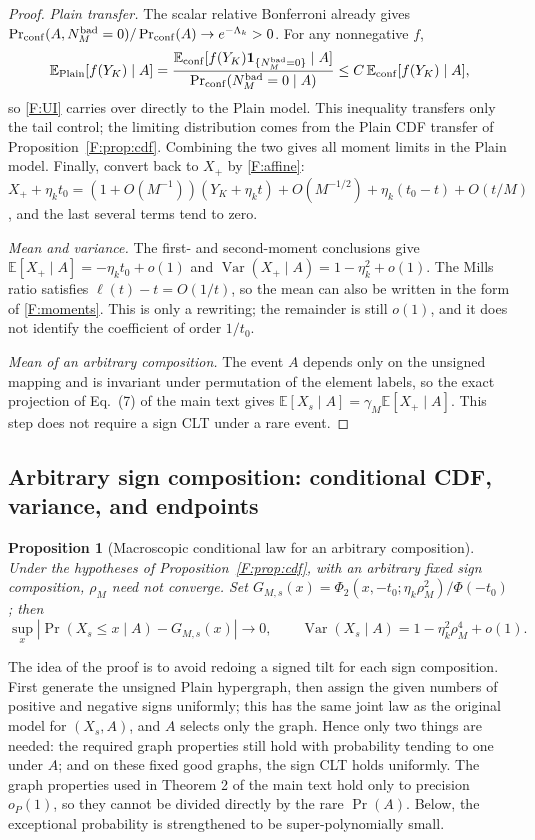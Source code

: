 \documentclass[a4paper,11pt]{article}
\newtheorem{proposition}[theorem]{Proposition}
\numberwithin{equation}{section}
\newcommand{\E}{\mathbb E}
\newcommand{\Var}{\operatorname{Var}}
\begin{document}
\begin{proof}
\emph{Plain transfer.} The scalar relative Bonferroni already gives
$\Pr_{\rm conf}(A,N^{\rm bad}_M=0)/\Pr_{\rm conf}(A)\to e^{-\Lambda_k}>0$. For any nonnegative $f$,
\[
\E_{\rm Plain}[f(Y_K)\mid A]=\frac{\E_{\rm conf}[f(Y_K)\mathbf1_{\{N^{\rm bad}_M=0\}}\mid A]}{\Pr_{\rm conf}(N^{\rm bad}_M=0\mid A)}\le C\,\E_{\rm conf}[f(Y_K)\mid A],
\]
so \eqref{F:UI} carries over directly to the Plain model. This inequality transfers only the tail control; the
limiting distribution comes from the Plain CDF transfer of Proposition~\ref{F:prop:cdf}. Combining the two
gives all moment limits in the Plain model. Finally, convert back to $X_+$ by \eqref{F:affine}:
$X_++\eta_kt_0=(1+O(M^{-1}))(Y_K+\eta_kt)+O(M^{-1/2})+\eta_k(t_0-t)+O(t/M)$, and the last several terms tend
to zero.

\emph{Mean and variance.} The first- and second-moment conclusions give $\E[X_+\mid A]=-\eta_kt_0+o(1)$ and
$\Var(X_+\mid A)=1-\eta_k^2+o(1)$. The Mills ratio satisfies $\ell(t)-t=O(1/t)$, so the mean can also be
written in the form of \eqref{F:moments}. This is only a rewriting; the remainder is still $o(1)$, and it does
not identify the coefficient of order $1/t_0$.

\emph{Mean of an arbitrary composition.} The event $A$ depends only on the unsigned mapping and is invariant
under permutation of the element labels, so the exact projection of Eq.~(7) of the main text gives
$\E[X_s\mid A]=\gamma_M\E[X_+\mid A]$. This step does not require a sign CLT under a rare event.
\end{proof}

\subsection{Arbitrary sign composition: conditional CDF, variance, and endpoints}

\begin{proposition}[Macroscopic conditional law for an arbitrary composition]\label{F:prop:sign}
Under the hypotheses of Proposition~\ref{F:prop:cdf}, with an arbitrary fixed sign composition, $\rho_M$ need
not converge. Set $G_{M,s}(x)=\Phi_2(x,-t_0;\eta_k\rho_M^2)/\Phi(-t_0)$; then
\begin{equation}
\sup_x|\Pr(X_s\le x\mid A)-G_{M,s}(x)|\to0,\qquad\Var(X_s\mid A)=1-\eta_k^2\rho_M^4+o(1).\label{F:sign}
\end{equation}
\end{proposition}

The idea of the proof is to avoid redoing a signed tilt for each sign composition. First generate the unsigned
Plain hypergraph, then assign the given numbers of positive and negative signs uniformly; this has the same
joint law as the original model for $(X_s,A)$, and $A$ selects only the graph. Hence only two things are
needed: the required graph properties still hold with probability tending to one under $A$; and on these fixed
good graphs, the sign CLT holds uniformly. The graph properties used in Theorem 2 of the main text hold only to
precision $o_P(1)$, so they cannot be divided directly by the rare $\Pr(A)$. Below, the exceptional probability
is strengthened to be super-polynomially small.
\end{document}

